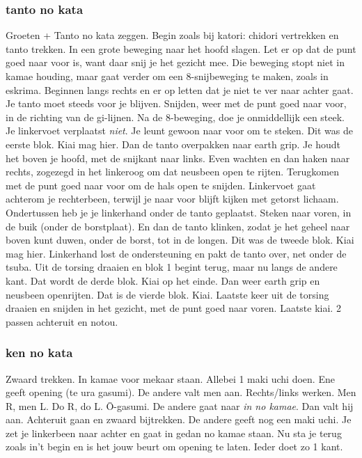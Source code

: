 \subsubsection{tanto no kata}
Groeten + Tanto no kata zeggen.
Begin zoals bij katori: chidori vertrekken en tanto trekken.
In een grote beweging naar het hoofd slagen. Let er op dat de punt goed naar voor is,
want daar snij je het gezicht mee.
Die beweging stopt niet in kamae houding, maar gaat verder om een 8-snijbeweging te maken, zoals in eskrima.
Beginnen langs rechts en er op letten dat je niet te ver naar achter gaat. Je tanto moet steeds voor je blijven.
Snijden, weer met de punt goed naar voor, in de richting van de gi-lijnen.
Na de 8-beweging, doe je onmiddellijk een steek. Je linkervoet verplaatst \textit{niet}. Je leunt gewoon naar voor om te steken.
Dit was de eerste blok. Kiai mag hier.
Dan de tanto overpakken naar earth grip. Je houdt het boven je hoofd, met de snijkant naar links.
Even wachten en dan haken naar rechts, zogezegd in het linkeroog om dat neusbeen open te rijten. Terugkomen met de punt goed naar voor om de hals open te snijden. Linkervoet gaat achterom je rechterbeen, terwijl je naar voor blijft kijken met getorst lichaam. Ondertussen heb je je linkerhand onder de tanto geplaatst. Steken naar voren, in de buik (onder de borstplaat). En dan de tanto klinken, zodat je het geheel naar boven kunt duwen, onder de borst, tot in de longen.
Dit was de tweede blok. Kiai mag hier.
Linkerhand lost de ondersteuning en pakt de tanto over, net onder de tsuba. Uit de torsing draaien en blok 1 begint terug, maar nu langs de andere kant.
Dat wordt de derde blok. Kiai op het einde.
Dan weer earth grip en neusbeen openrijten. Dat is de vierde blok. Kiai.
Laatste keer uit de torsing draaien en snijden in het gezicht, met de punt goed naar voren. Laatste kiai.
2 passen achteruit en notou.

\subsubsection{ken no kata}
Zwaard trekken. In kamae voor mekaar staan. Allebei 1 maki uchi doen.
Ene geeft opening (te ura gasumi). De andere valt men aan.
Rechts/links werken.
Men R, men L.
Do R, do L.
\={O}-gasumi. De andere gaat naar \textit{in no kamae}. Dan valt hij aan. Achteruit gaan en zwaard bijtrekken.
De andere geeft nog een maki uchi. Je zet je linkerbeen naar achter en gaat in gedan no kamae staan.
Nu sta je terug zoals in't begin en is het jouw beurt om opening te laten.
Ieder doet zo 1 kant.

